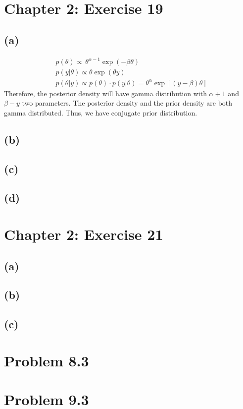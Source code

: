 \documentclass[11pt]{article}
\begin{document}
\section*{Chapter 2: Exercise 19}
\subsection*{(a)}
\begin{align*}
&p(\theta) \propto\ \theta^{\alpha-1}\exp(-\beta \theta)\\
&p(y|\theta) \propto \theta \exp(\theta y)\\
&p(\theta|y)\propto p(\theta)\cdot p(y|\theta)=\theta^{\alpha}\exp[(y-\beta)\theta]
\end{align*}
Therefore, the posterior density will have gamma distribution with $\alpha+1$ and $\beta-y$ two parameters. The posterior density and the prior density are both gamma distributed. Thus, we have conjugate prior distribution.
\subsection*{(b)}

\subsection*{(c)}
\subsection*{(d)}

\section*{Chapter 2: Exercise 21}
\subsection*{(a)}
\subsection*{(b)}
\subsection*{(c)}

\newpage
\section*{Problem 8.3}

\newpage
\section*{Problem 9.3}
\end{document}
